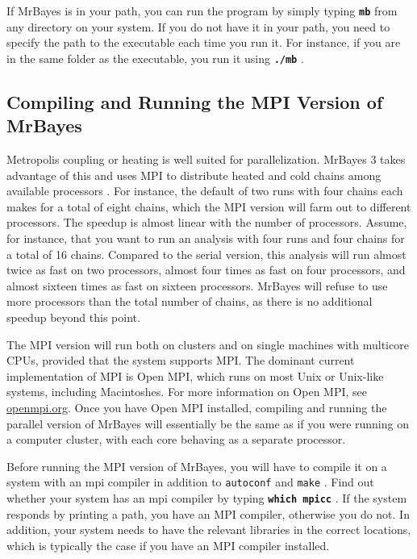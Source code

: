 \documentclass[12pt]{book}
\newcommand{\ttt}[1]{\texttt{#1} }
\newcommand{\tb}[1]{\ttt{\textbf{#1}} }
\begin{document}
If MrBayes is in your path, you can run the program by simply typing \tb{mb} from any directory on
your system. If you do not have it in your path, you need to specify the path to the executable
each time you run it. For instance, if you are in the same folder as the executable, you run it
using \tb{./mb}.

\subsection{Compiling and Running the MPI Version of MrBayes}
\label{MPIversion}

Metropolis coupling or heating is well suited for parallelization. MrBayes 3 takes advantage of
this and uses MPI to distribute heated and cold chains among available processors
\citep{altekar04}. For instance, the default of two runs with four chains each makes for a total of
eight chains, which the MPI version will farm out to different processors. The speedup is almost
linear with the number of processors.  Assume, for instance, that you want to run an analysis with
four runs and four chains for a total of 16 chains. Compared to the serial version, this analysis
will run almost twice as fast on two processors, almost four times as fast on four processors, and
almost sixteen times as fast on sixteen processors.  MrBayes will refuse to use more processors
than the total number of chains, as there is no additional speedup beyond this point.

The MPI version will run both on clusters and on single machines with multicore CPUs, provided that
the system supports MPI. The dominant current implementation of MPI is Open MPI, which runs on most
Unix or Unix-like systems, including Macintoshes. For more information on Open MPI, see
\url{openmpi.org}. Once you have Open MPI installed, compiling and running the parallel version of
MrBayes will essentially be the same as if you were running on a computer cluster, with each core
behaving as a separate processor.

Before running the MPI version of MrBayes, you will have to compile it on a system with an mpi
compiler in addition to \ttt{autoconf} and \ttt{make}. Find out whether your system has an mpi
compiler by typing \tb{which mpicc}.  If the system responds by printing a path, you have an MPI
compiler, otherwise you do not. In addition, your system needs to have the relevant libraries in
the correct locations, which is typically the case if you have an MPI compiler installed.
\end{document}
